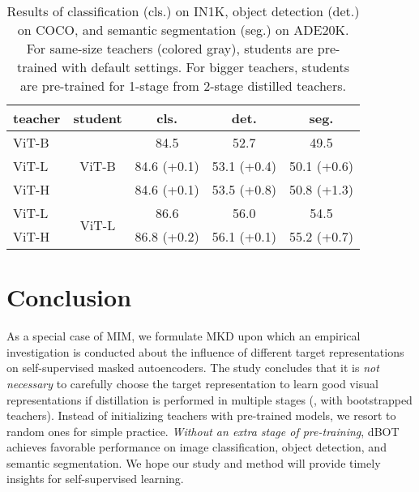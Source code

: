 \documentclass[10pt,twocolumn,letterpaper]{article}
\def\ourmethod{{dBOT}\xspace}
\begin{document}
\begin{table}
    \begin{center}
    \setlength{\tabcolsep}{1.2mm}
    \begin{tabular}{l|c|ccc}
        teacher& student& cls. & det.& seg. \\
        \hline
        \textcolor{gray!80}{ViT-B}&\multirow{3}{*}{ViT-B} & \textcolor{gray!80}{84.5} \hspace{0.88cm} & \textcolor{gray!80}{52.7} \hspace{0.88cm} & \textcolor{gray!80}{49.5} \hspace{0.88cm} \\
        ViT-L& & 84.6 \textcolor{mgreen}{(+0.1)}&   53.1 \textcolor{mgreen}{(+0.4)}&   50.1 \textcolor{mgreen}{(+0.6)}\\
        ViT-H& &   84.6 \textcolor{mgreen}{(+0.1)}&   53.5 \textcolor{mgreen}{(+0.8)}&   50.8 \textcolor{mgreen}{(+1.3)}\\
        \hline
        \textcolor{gray!80}{ViT-L} & \multirow{2}{*}{ViT-L} &\textcolor{gray!80}{86.6} \hspace{0.88cm} & \textcolor{gray!80}{56.0} \hspace{0.88cm} &\textcolor{gray!80}{54.5} \hspace{0.88cm} \\
        ViT-H && 86.8 \textcolor{mgreen}{(+0.2)} & 56.1 \textcolor{mgreen}{(+0.1)} & 55.2 \textcolor{mgreen}{(+0.7)}\\
    \end{tabular}
    \end{center}
    \caption{Results of classification (cls.) on IN1K, object detection (det.) on COCO, and semantic segmentation (seg.) on ADE20K. 
    For same-size teachers (colored \textcolor{gray!80}{gray}), students are pre-trained with default settings.
    For bigger teachers, students are pre-trained for 1-stage from 2-stage distilled teachers.}
    \label{tab:big model}
\vspace{-0.3cm}
\end{table}

\section{Conclusion}
As a special case of MIM, we formulate MKD upon which an empirical investigation is conducted about the influence of different target representations on self-supervised masked autoencoders. 
The study concludes that it is \textit{not necessary} to carefully choose the target representation to learn good visual representations if distillation is performed in multiple stages (\ie, with bootstrapped teachers).
Instead of initializing teachers with pre-trained models, we resort to random ones for simple practice.
\textit{Without an extra stage of pre-training}, \ourmethod achieves favorable performance on image classification, object detection, and semantic segmentation.
We hope our study and method will provide timely insights for self-supervised learning.
\end{document}
